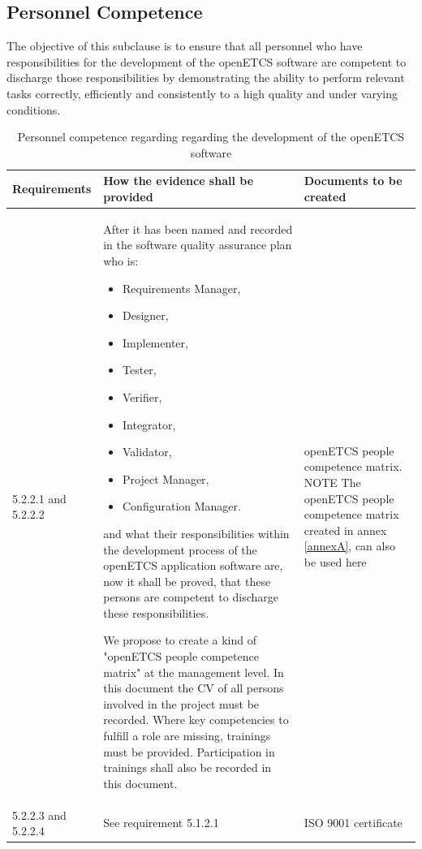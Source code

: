 \documentclass{template/openetcs_report}
\begin{document}
\subsection{Personnel Competence}
\begin{flushleft}
The objective of this subclause is to ensure that all personnel who have responsibilities for the development of the openETCS software are competent to discharge those responsibilities by demonstrating the ability to perform relevant tasks correctly, efficiently and consistently to a high quality and under varying conditions.
\end{flushleft}
{\footnotesize\sffamily\centering
\begin{longtable}{|p{2cm}|p{9cm}|p{3cm}|}
\caption{Personnel competence regarding regarding the development of the openETCS software}\\
\hline
\bfseries Requirements & \bfseries How the evidence shall be provided & \bfseries Documents to be created\\
\hline
\hline
\endhead
\hline
\endfoot

5.2.2.1 and 5.2.2.2 & After it has been named and recorded in the software quality assurance plan who is:
\begin{itemize}\itemsep=0pt
  \item Requirements Manager,
  \item Designer,
  \item Implementer,
  \item Tester,
  \item Verifier,
  \item Integrator,
  \item Validator,
  \item Project Manager,
  \item Configuration Manager.
\end{itemize}
and what their responsibilities within the development process of the openETCS application software are, now it shall be proved, that these persons are competent to discharge these responsibilities.

We propose to create a kind of "openETCS people competence matrix" at the management level. In this document the CV of all persons involved in the project must be recorded.
Where key competencies to fulfill a role are missing, trainings must be provided.
Participation in trainings shall also be recorded in this document.
& openETCS people competence matrix.
\linebreak
\linebreak
NOTE\linebreak
The openETCS people competence matrix created in annex \ref{annexA}, can also be used here\\ 
\hline
5.2.2.3 and 5.2.2.4 & See requirement 5.1.2.1 & ISO 9001 certificate\\ 
\hline
\end{longtable}}
\end{document}
